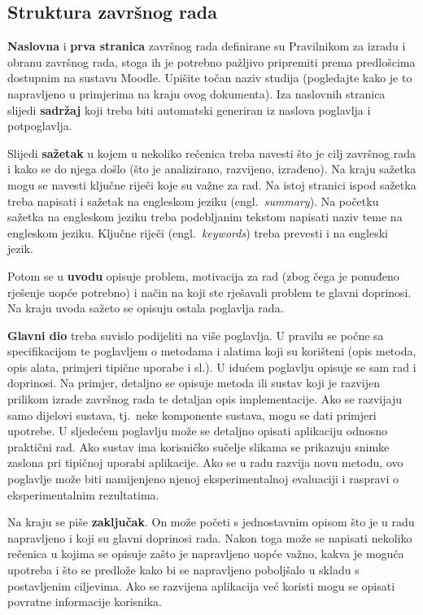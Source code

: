 \subsection{Struktura završnog rada}
\textbf{Naslovna} i \textbf{prva stranica} završnog rada definirane su Pravilnikom za izradu i obranu završnog rada, stoga ih je potrebno pažljivo pripremiti prema predlošcima dostupnim na sustavu Moodle. Upišite točan naziv studija (pogledajte kako je to napravljeno u primjerima na kraju ovog dokumenta). Iza naslovnih stranica slijedi \textbf{sadržaj} koji treba biti automatski generiran iz naslova poglavlja i potpoglavlja.

Slijedi \textbf{sažetak} u kojem u nekoliko rečenica treba navesti što je cilj završnog rada i kako se do njega došlo (što je analizirano, razvijeno, izrađeno). Na kraju sažetka mogu se navesti ključne riječi koje su važne za rad. Na istoj stranici ispod sažetka treba napisati i sažetak na engleskom jeziku (engl.~\textit{summary}). Na početku sažetka na engleskom jeziku treba podebljanim tekstom napisati naziv teme na engleskom jeziku. Ključne riječi (engl.~\textit{keywords}) treba prevesti i na engleski jezik.

Potom se u \textbf{uvodu} opisuje problem, motivacija za rad (zbog čega je ponuđeno rješenje uopće potrebno) i način na koji ste rješavali problem te glavni doprinosi. Na kraju uvoda sažeto se opisuju ostala poglavlja rada.

\textbf{Glavni dio} treba suvislo podijeliti na više poglavlja. U pravilu se počne sa specifikacijom te poglavljem o metodama i alatima koji su korišteni (opis metoda, opis alata, primjeri tipične uporabe i sl.). U idućem poglavlju opisuje se sam rad i doprinosi. Na primjer, detaljno se opisuje metoda ili sustav koji je razvijen prilikom izrade završnog rada te detaljan opis implementacije. Ako se razvijaju samo dijelovi sustava, tj.~neke komponente sustava, mogu se dati primjeri upotrebe. U sljedećem poglavlju može se detaljno opisati aplikaciju odnosno praktični rad. Ako sustav ima korisničko sučelje slikama se prikazuju snimke zaslona pri tipičnoj uporabi aplikacije. Ako se u radu razvija novu metodu, ovo poglavlje može biti namijenjeno njenoj eksperimentalnoj evaluaciji i raspravi o eksperimentalnim rezultatima.

Na kraju se piše \textbf{zaključak}. On može početi s jednostavnim opisom što je u radu napravljeno i koji su glavni doprinosi rada. Nakon toga može se napisati nekoliko rečenica u kojima se opisuje zašto je napravljeno uopće važno, kakva je moguća upotreba i što se predlože kako bi se napravljeno poboljšalo u skladu s postavljenim ciljevima. Ako se razvijena aplikacija već koristi mogu se opisati povratne informacije korisnika.

